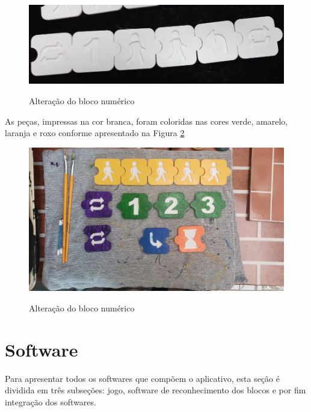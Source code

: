     \begin{figure}[H]
        \caption{Alteração do bloco numérico}
        \centering
        \includegraphics[width=\linewidth]{Imagens/Cap4/alteracao_bloco_numerico.jpg}
        \label{figura:alteracao_bloco_numerico}
    \end{figure}
    
    As peças, impressas na cor branca, foram coloridas nas cores verde, amarelo, laranja e roxo conforme apresentado na Figura \ref{figura:blocos_pintados}
    
    \begin{figure}[H]
        \caption{Alteração do bloco numérico}
        \centering
        \includegraphics[width=\linewidth]{Imagens/Cap4/blocos_pintados.jpeg}
        \label{figura:blocos_pintados}
    \end{figure}

\section{Software}

Para apresentar todos os softwares que compõem o aplicativo, esta seção é dividida em três subseções: jogo, software de reconhecimento dos blocos e por fim integração dos softwares.

